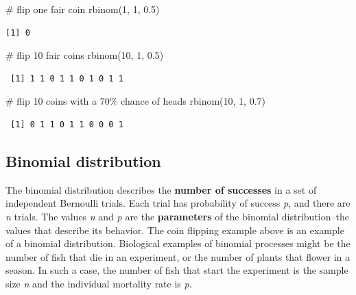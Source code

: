 \documentclass[
  13,
  letterpaper,
]{report}
\newenvironment{Shaded}{\begin{snugshade}}{\end{snugshade}}
\newcommand{\CommentTok}[1]{\textcolor[rgb]{0.37,0.37,0.37}{#1}}
\newcommand{\DecValTok}[1]{\textcolor[rgb]{0.68,0.00,0.00}{#1}}
\newcommand{\FloatTok}[1]{\textcolor[rgb]{0.68,0.00,0.00}{#1}}
\newcommand{\FunctionTok}[1]{\textcolor[rgb]{0.28,0.35,0.67}{#1}}
\newcommand{\NormalTok}[1]{\textcolor[rgb]{0.00,0.23,0.31}{#1}}
\begin{document}
\begin{Shaded}
\begin{Highlighting}[]
\CommentTok{\# flip one fair coin}
\FunctionTok{rbinom}\NormalTok{(}\DecValTok{1}\NormalTok{, }\DecValTok{1}\NormalTok{, }\FloatTok{0.5}\NormalTok{)}
\end{Highlighting}
\end{Shaded}

\begin{verbatim}
[1] 0
\end{verbatim}

\begin{Shaded}
\begin{Highlighting}[]
\CommentTok{\# flip 10 fair coins}
\FunctionTok{rbinom}\NormalTok{(}\DecValTok{10}\NormalTok{, }\DecValTok{1}\NormalTok{, }\FloatTok{0.5}\NormalTok{)}
\end{Highlighting}
\end{Shaded}

\begin{verbatim}
 [1] 1 1 0 1 1 0 1 0 1 1
\end{verbatim}

\begin{Shaded}
\begin{Highlighting}[]
\CommentTok{\# flip 10 coins with a 70\% chance of heads}
\FunctionTok{rbinom}\NormalTok{(}\DecValTok{10}\NormalTok{, }\DecValTok{1}\NormalTok{, }\FloatTok{0.7}\NormalTok{)}
\end{Highlighting}
\end{Shaded}

\begin{verbatim}
 [1] 0 1 1 0 1 1 0 0 0 1
\end{verbatim}

\subsection{Binomial distribution}\label{sec-dist-binom}

The binomial distribution describes the \textbf{number of successes} in
a set of independent Bernoulli trials. Each trial has probability of
success \emph{p}, and there are \emph{n} trials. The values \emph{n} and
\emph{p} are the \textbf{parameters} of the binomial distribution--the
values that describe its behavior. The coin flipping example above is an
example of a binomial distribution. Biological examples of binomial
processes might be the number of fish that die in an experiment, or the
number of plants that flower in a season. In such a case, the number of
fish that start the experiment is the sample size \emph{n} and the
individual mortality rate is \emph{p}.
\end{document}
